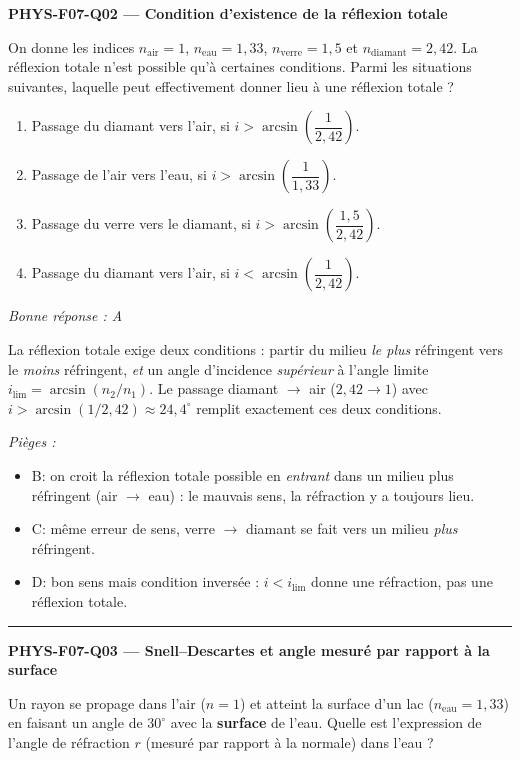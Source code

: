 \documentclass[11pt,a4paper]{article}
\begin{document}
\noindent\textbf{PHYS-F07-Q02 --- Condition d'existence de la réflexion totale}\par
On donne les indices $n_{\text{air}}=1$, $n_{\text{eau}}=1{,}33$, $n_{\text{verre}}=1{,}5$ et $n_{\text{diamant}}=2{,}42$. La réflexion totale n'est possible qu'à certaines conditions. Parmi les situations suivantes, laquelle peut effectivement donner lieu à une réflexion totale ?
\begin{enumerate}[label=\Alph*)]
\item Passage du diamant vers l'air, si $i > \arcsin\!\left(\dfrac{1}{2{,}42}\right)$.
\item Passage de l'air vers l'eau, si $i > \arcsin\!\left(\dfrac{1}{1{,}33}\right)$.
\item Passage du verre vers le diamant, si $i > \arcsin\!\left(\dfrac{1{,}5}{2{,}42}\right)$.
\item Passage du diamant vers l'air, si $i < \arcsin\!\left(\dfrac{1}{2{,}42}\right)$.
\end{enumerate}
\textit{Bonne réponse : A}\par
La réflexion totale exige deux conditions : partir du milieu \emph{le plus} réfringent vers le \emph{moins} réfringent, \emph{et} un angle d'incidence \emph{supérieur} à l'angle limite $i_{\text{lim}}=\arcsin(n_2/n_1)$. Le passage diamant $\to$ air ($2{,}42 \to 1$) avec $i>\arcsin(1/2{,}42)\approx 24{,}4^\circ$ remplit exactement ces deux conditions.\par
\textit{Pièges :}
\begin{itemize}
\item B: on croit la réflexion totale possible en \emph{entrant} dans un milieu plus réfringent (air $\to$ eau) : le mauvais sens, la réfraction y a toujours lieu.
\item C: même erreur de sens, verre $\to$ diamant se fait vers un milieu \emph{plus} réfringent.
\item D: bon sens mais condition inversée : $i<i_{\text{lim}}$ donne une réfraction, pas une réflexion totale.
\end{itemize}
\vspace{8pt}\hrule\vspace{8pt}

\noindent\textbf{PHYS-F07-Q03 --- Snell--Descartes et angle mesuré par rapport à la surface}\par
Un rayon se propage dans l'air ($n=1$) et atteint la surface d'un lac ($n_{\text{eau}}=1{,}33$) en faisant un angle de $30^\circ$ avec la \textbf{surface} de l'eau. Quelle est l'expression de l'angle de réfraction $r$ (mesuré par rapport à la normale) dans l'eau ?
\end{document}
